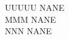 
\begin{titlepage}

\newcommand{\HRule}{\rule{\linewidth}{0.5mm}} %

\center %
\textsc{\LARGE UUUUU NANE}\\ [1.5cm]
\textsc{\Large MMM NANE}\\ [0.5cm]
\textsc{\large NNN NANE}\\ [0.5cm]



\end{titlepage}